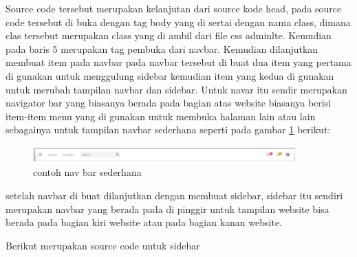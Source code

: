 Source code tersebut merupakan kelanjutan dari source kode head, pada source code tersebut di buka dengan tag body yang di sertai dengan nama class, dimana clas tersebut merupakan class yang di ambil dari file css adminlte. Kemudian pada baris 5 merupakan tag pembuka dari navbar. Kemudian dilanjutkan membuat item pada navbar pada navbar tersebut di buat dua item yang pertama di gunakan untuk menggulung sidebar kemudian item yang kedua di gunakan untuk merubah tampilan navbar dan sidebar. Untuk navar itu sendir merupakan navigator bar yang biasanya berada pada bagian atas website biasanya berisi item-item menu yang di gunakan untuk membuka halaman lain atau lain sebagainya untuk tampilan navbar sederhana seperti pada gambar \ref{ve1} berikut:\par


\begin{figure}[!htbp]
	\centerline{\includegraphics[width=0.90\textwidth]{figures/view/1.png}}
	\caption{contoh nav bar sederhana}
	\label{ve1}
\end{figure}


setelah navbar di buat dilanjutkan dengan membuat sidebar, sidebar itu sendiri merupakan navbar yang berada pada di pinggir untuk tampilan website bisa berada pada bagian kiri website atau pada bagian kanan website.\par
Berikut merupakan source code untuk sidebar

